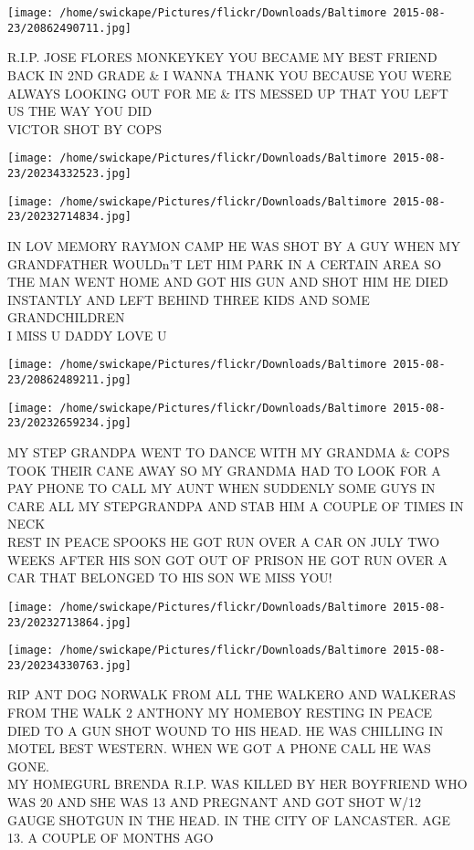 \documentclass[10pt,letterpaper]{article}
\begin{document}
\vspace{0.25in}
\texttt{[image: /home/swickape/Pictures/flickr/Downloads/Baltimore 2015-08-23/20862490711.jpg]}

R.I.P. JOSE FLORES MONKEYKEY YOU BECAME MY BEST FRIEND BACK IN 2ND GRADE \& I WANNA THANK YOU BECAUSE YOU WERE ALWAYS LOOKING OUT FOR ME \& ITS MESSED UP THAT YOU LEFT US THE WAY YOU DID\\
VICTOR SHOT BY COPS
\pagebreak

\texttt{[image: /home/swickape/Pictures/flickr/Downloads/Baltimore 2015-08-23/20234332523.jpg]}

\vspace{0.25in}
\texttt{[image: /home/swickape/Pictures/flickr/Downloads/Baltimore 2015-08-23/20232714834.jpg]}

IN LOV MEMORY RAYMON CAMP HE WAS SHOT BY A GUY WHEN MY GRANDFATHER WOULDn'T LET HIM PARK IN A CERTAIN AREA SO THE MAN WENT HOME AND GOT HIS GUN AND SHOT HIM HE DIED INSTANTLY AND LEFT BEHIND THREE KIDS AND SOME GRANDCHILDREN\\
I MISS U DADDY LOVE U
\pagebreak

\texttt{[image: /home/swickape/Pictures/flickr/Downloads/Baltimore 2015-08-23/20862489211.jpg]}

\vspace{0.25in}
\texttt{[image: /home/swickape/Pictures/flickr/Downloads/Baltimore 2015-08-23/20232659234.jpg]}

MY STEP GRANDPA WENT TO DANCE WITH MY GRANDMA \& COPS TOOK THEIR CANE AWAY SO MY GRANDMA HAD TO LOOK FOR A PAY PHONE TO CALL MY AUNT WHEN SUDDENLY SOME GUYS IN CARE ALL MY STEPGRANDPA AND STAB HIM A COUPLE OF TIMES IN NECK\\
REST IN PEACE SPOOKS HE GOT RUN OVER A CAR ON JULY TWO WEEKS AFTER HIS SON GOT OUT OF PRISON HE GOT RUN OVER A CAR THAT BELONGED TO HIS SON WE MISS YOU!
\pagebreak

\texttt{[image: /home/swickape/Pictures/flickr/Downloads/Baltimore 2015-08-23/20232713864.jpg]}

\vspace{0.25in}
\texttt{[image: /home/swickape/Pictures/flickr/Downloads/Baltimore 2015-08-23/20234330763.jpg]}

RIP ANT DOG NORWALK FROM ALL THE WALKERO AND WALKERAS FROM THE WALK  2 ANTHONY MY HOMEBOY RESTING IN PEACE DIED TO A GUN SHOT WOUND TO HIS HEAD.  HE WAS CHILLING IN MOTEL BEST WESTERN.  WHEN WE GOT A PHONE CALL HE WAS GONE.\\
MY HOMEGURL BRENDA R.I.P. WAS KILLED BY HER BOYFRIEND WHO WAS 20 AND SHE WAS 13 AND PREGNANT AND GOT SHOT W/12 GAUGE SHOTGUN IN THE HEAD.  IN THE CITY OF LANCASTER.  AGE 13.  A COUPLE OF MONTHS AGO
\pagebreak
\end{document}
